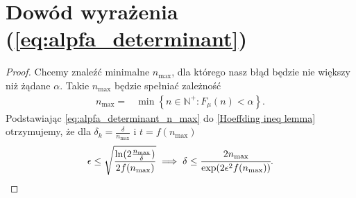 \documentclass[inzynierska]{pwr_wmat_praca_dyplomowa}
\theoremstyle{plain}
\numberwithin{theorem}{chapter}
\theoremstyle{definition}
\numberwithin{theorem}{chapter}
\newcommand{\nmax}{n_{\text{max}}}
\begin{document}
\section{Dowód wyrażenia (\ref{eq:alpfa_determinant})}
\begin{proof}\label{proof:alpfa_determinant}
	Chcemy znaleźć minimalne $\nmax$, dla którego nasz błąd będzie nie większy niż żądane $\alpha$. Takie $\nmax$ będzie spełniać zależność 
	\begin{align}
		\label{eq:alpfa_determinant_n_max}
		\nmax =& \min \left\{n\in \mathbb{N}^+: F_{\mu}(n) < \alpha \right\}.
	\end{align}
	Podstawiając \eqref{eq:alpfa_determinant_n_max} do \ref{Hoeffding ineq lemma} otrzymujemy, że dla $\delta_k = \frac{\delta}{\nmax}$ i $t = f(\nmax)$
	\begin{align*}
		\epsilon \le  \sqrt{\frac{\ln(2\frac{\nmax}{\delta})}{2f(\nmax)}} \implies \delta \le   \cfrac{2\nmax}{\exp(2\epsilon^2f(\nmax))}.
	\end{align*}
\end{proof}




\end{document}
